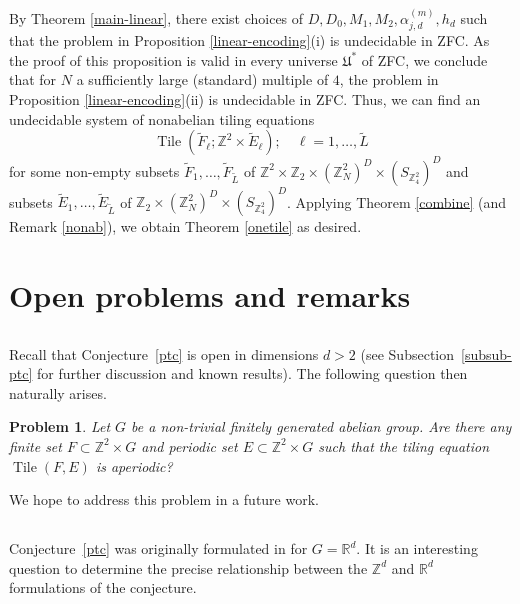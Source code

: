 \documentclass[reqno,a4paper,12pt]{amsart}
\numberwithin{equation}{section}
\numberwithin{figure}{section}
\def\R{\mathbb{R}}
\def\Z{\mathbb{Z}}
\newcommand{\Tile}{\operatorname{Tile}}
\newcommand{\Universe}{{\mathfrak{U}}}
\theoremstyle{plain}
\newtheorem{problem}[thm]{Problem}
\theoremstyle{definition}
\newcommand{\subsecref}[1]{Subsection~\ref{#1}}
\newcommand{\conjref}[1]{Conjecture~\ref{#1}}
\begin{document}
By Theorem \ref{main-linear}, there exist choices of $D, D_0, M_1, M_2, \alpha_{j,d}^{(m)}, h_d$ such that the problem in Proposition \ref{linear-encoding}(i) is undecidable in ZFC.  As the proof of this proposition is valid in every universe $\Universe^*$ of ZFC, we conclude that for $N$ a sufficiently large (standard) multiple of $4$, the problem in Proposition \ref{linear-encoding}(ii) is undecidable in ZFC.  Thus, we can find an undecidable system of nonabelian tiling equations
$$ \Tile( \tilde F_\ell; \Z^2 \times \tilde E_\ell ); \quad \ell = 1,\dots,\tilde L$$
for some non-empty subsets $\tilde F_1,\dots,\tilde F_{\tilde L}$ of $\Z^2 \times \Z_2 \times (\Z_N^2)^D \times (S_{\Z_4^2})^D$ and subsets $\tilde E_1, \dots, \tilde E_{\tilde L}$ of $\Z_2 \times (\Z_N^2)^D \times (S_{\Z_4^2})^D$.  Applying Theorem \ref{combine} (and Remark \ref{nonab}), we obtain Theorem \ref{onetile} as desired.



\section{Open problems and remarks}\label{sec-problems}


\subsection{}
Recall that \conjref{ptc} is open in dimensions $d>2$ (see \subsecref{subsub-ptc}  for further discussion and known results). The following question then naturally arises.

\begin{problem}
Let $G$ be a non-trivial finitely generated abelian group. Are there  any finite set $F\subset \Z^2\times G$ and periodic set $E\subset \Z^2\times G$ such that  the tiling equation $\Tile(F,E)$ is aperiodic? 
\end{problem}
We hope to address this problem in a future work.



\subsection{}
\conjref{ptc} was originally formulated in \cite{LW} for $G=\R^d$.   It is an interesting question to determine the precise relationship  between the $\Z^d$ and $\R^d$
formulations of the conjecture.
\end{document}
